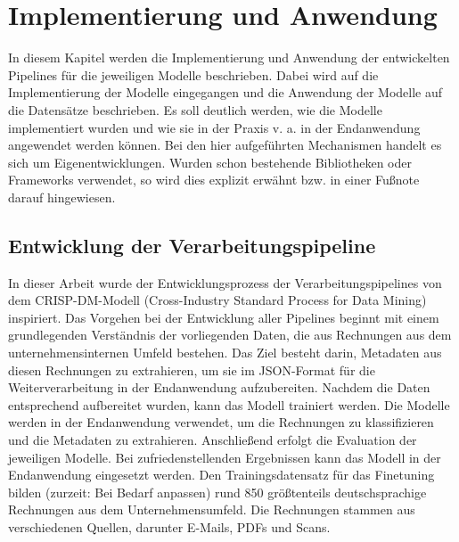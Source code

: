 \chapter{Implementierung und Anwendung}
In diesem Kapitel werden die Implementierung und Anwendung der entwickelten Pipelines für die jeweiligen Modelle beschrieben. Dabei wird auf die Implementierung der Modelle eingegangen und die Anwendung der Modelle auf die Datensätze beschrieben. Es soll deutlich werden, wie die Modelle implementiert wurden und wie sie in der Praxis v. a. in der Endanwendung angewendet werden können. Bei den hier aufgeführten Mechanismen handelt es sich um Eigenentwicklungen. Wurden schon bestehende Bibliotheken oder Frameworks verwendet, so wird dies explizit erwähnt bzw. in einer Fußnote darauf hingewiesen.

\section{Entwicklung der Verarbeitungspipeline}
In dieser Arbeit wurde der Entwicklungsprozess der Verarbeitungspipelines von dem CRISP-DM-Modell (Cross-Industry Standard Process for Data Mining) inspiriert. Das Vorgehen bei der Entwicklung aller Pipelines beginnt mit einem grundlegenden Verständnis der vorliegenden Daten, die aus Rechnungen aus dem unternehmensinternen Umfeld bestehen. Das Ziel besteht darin, Metadaten aus diesen Rechnungen zu extrahieren, um sie im JSON-Format für die Weiterverarbeitung in der Endanwendung aufzubereiten. Nachdem die Daten entsprechend aufbereitet wurden, kann das Modell trainiert werden. Die Modelle werden in der Endanwendung verwendet, um die Rechnungen zu klassifizieren und die Metadaten zu extrahieren. Anschließend erfolgt die Evaluation der jeweiligen Modelle. Bei zufriedenstellenden Ergebnissen kann das Modell in der Endanwendung eingesetzt werden. Den Trainingsdatensatz für das Finetuning bilden (zurzeit: Bei Bedarf anpassen) rund 850 größtenteils deutschsprachige Rechnungen aus dem Unternehmensumfeld. Die Rechnungen stammen aus verschiedenen Quellen, darunter E-Mails, PDFs und Scans. 
